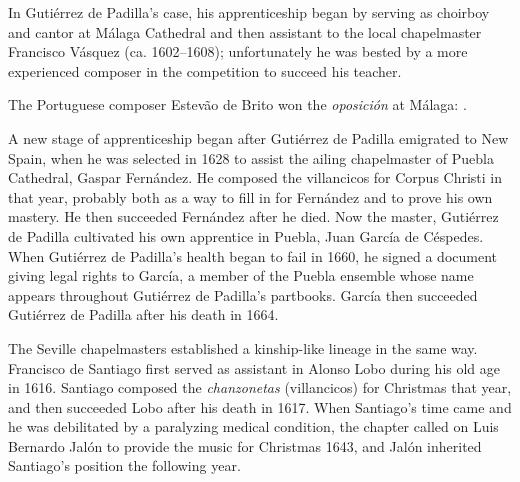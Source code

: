 In Gutiérrez de Padilla's case, his apprenticeship began by serving as choirboy
and cantor at Málaga Cathedral and then assistant to the local chapelmaster
Francisco Vásquez (ca. 1602--1608); unfortunately he was bested by a more
experienced composer in the competition to succeed his teacher.%
\begin{Footnote}
    The Portuguese composer Estevão de Brito won the \emph{oposición} at
    Málaga: \autocites{Gembero:Padilla}{Stevenson:BritoE}.
\end{Footnote}
A new stage of apprenticeship began after Gutiérrez de Padilla emigrated to New
Spain, when he was selected in 1628 to assist the ailing chapelmaster of Puebla
Cathedral, Gaspar Fernández.%
    \Autocite{Morales:Fernandez}
He composed the villancicos for Corpus Christi in that year, probably both as a
way to fill in for Fernández and to prove his own mastery.%
    \Autocite{Cashner:Cards}
He then succeeded Fernández after he died.
Now the master, Gutiérrez de Padilla cultivated his own apprentice in Puebla,
Juan García de Céspedes.
When Gutiérrez de Padilla's health began to fail in 1660, he signed a
 document giving legal rights to García, a member of
the Puebla ensemble whose name appears throughout Gutiérrez de Padilla's
partbooks.  
García then succeeded Gutiérrez de Padilla after his death in 1664.%
    \Autocite[237--238]{Mauleon:PadillaCivil}

The Seville chapelmasters established a kinship-like lineage in the same way.
Francisco de Santiago first served as assistant in Alonso Lobo during his old
age in 1616.%
    \Autocite{Stevenson:SantiagoF}
Santiago composed the \emph{chanzonetas} (villancicos) for Christmas that year,
and then succeeded Lobo after his death in 1617.
When Santiago's time came and he was debilitated by a paralyzing medical
condition, the chapter called on Luis Bernardo Jalón to provide the music for
Christmas 1643, and Jalón inherited Santiago's position the following year.

